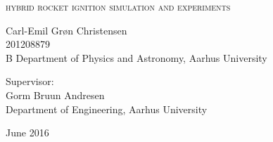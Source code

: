 
\begin{titlingpage}

\begin{center}

\vspace*{0cm}
\HUGE
\textsc{hybrid rocket ignition simulation and experiments}\\
\vspace{1.5cm}

%
\vspace{1.2cm}

\large
{
    Carl-Emil Grøn Christensen\\
    201208879\\B
    Department of Physics and Astronomy, Aarhus University
}

\vspace{1.5cm}

{
  Supervisor:\\
  Gorm Bruun Andresen\\
  Department of Engineering, Aarhus University
}

\vspace{1.5cm}
{June 2016}\\


\end{center}



\end{titlingpage}

